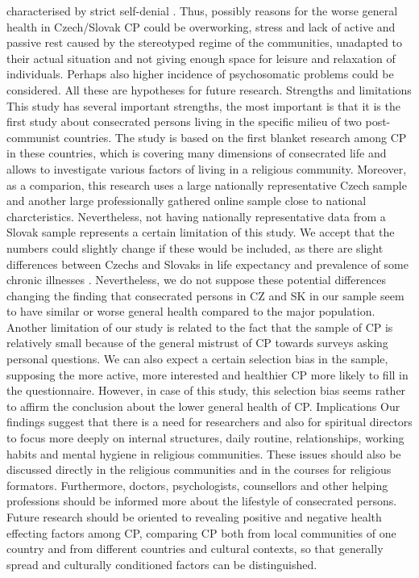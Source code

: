 \documentclass[ijerph,article,accept,moreauthors,pdftex]{mdpi}
\begin{document}
characterised by strict self-denial \citep{petravcek2013sekularizace}.
Thus, possibly reasons for the worse general health in Czech/Slovak CP
could be overworking, stress and lack of active and passive rest caused
by the stereotyped regime of the communities, unadapted to their actual
situation and not giving enough space for leisure and relaxation of
individuals. Perhaps also higher incidence of psychosomatic problems
could be considered. All these are hypotheses for future research.
Strengths and limitations This study has several important strengths,
the most important is that it is the first study about consecrated
persons living in the specific milieu of two post-communist countries.
The study is based on the first blanket research among CP in these
countries, which is covering many dimensions of consecrated life and
allows to investigate various factors of living in a religious
community. Moreover, as a comparion, this research uses a large
nationally representative Czech sample and another large professionally
gathered online sample close to national charcteristics. Nevertheless,
not having nationally representative data from a Slovak sample
represents a certain limitation of this study. We accept that the
numbers could slightly change if these would be included, as there are
slight differences between Czechs and Slovaks in life expectancy and
prevalence of some chronic illnesses \citep{vagavsova2017disparities}.
Nevertheless, we do not suppose these potential differences changing the
finding that consecrated persons in CZ and SK in our sample seem to have
similar or worse general health compared to the major population.
Another limitation of our study is related to the fact that the sample
of CP is relatively small because of the general mistrust of CP towards
surveys asking personal questions. We can also expect a certain
selection bias in the sample, supposing the more active, more interested
and healthier CP more likely to fill in the questionnaire. However, in
case of this study, this selection bias seems rather to affirm the
conclusion about the lower general health of CP. Implications Our
findings suggest that there is a need for researchers and also for
spiritual directors to focus more deeply on internal structures, daily
routine, relationships, working habits and mental hygiene in religious
communities. These issues should also be discussed directly in the
religious communities and in the courses for religious formators.
Furthermore, doctors, psychologists, counsellors and other helping
professions should be informed more about the lifestyle of consecrated
persons. Future research should be oriented to revealing positive and
negative health effecting factors among CP, comparing CP both from local
communities of one country and from different countries and cultural
contexts, so that generally spread and culturally conditioned factors
can be distinguished.
\end{document}
